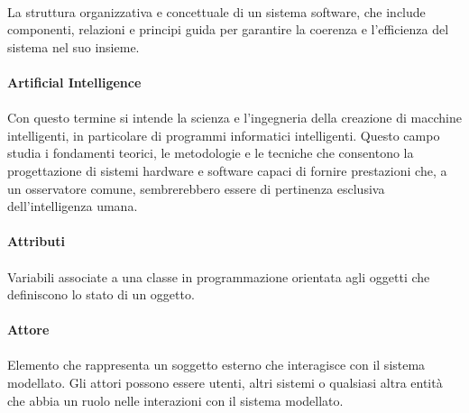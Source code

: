 \documentclass[10pt, a4paper]{article}
\begin{document}
\paragraph{}La struttura organizzativa e concettuale di un sistema software, che include componenti, relazioni e principi guida per garantire la coerenza e l'efficienza del sistema nel suo insieme.



\vspace{2em}
\paragraph{Artificial Intelligence}\noindent\hrulefill
\paragraph{}Con questo termine si intende la scienza e l’ingegneria della creazione di macchine intelligenti, in particolare di programmi informatici intelligenti. Questo campo studia i fondamenti teorici, le metodologie e le tecniche che consentono la progettazione di sistemi hardware e software capaci di fornire prestazioni che, a un osservatore comune, sembrerebbero essere di pertinenza esclusiva dell’intelligenza umana.

\vspace{2em}
\paragraph{Attributi}\noindent\hrulefill
\paragraph{}Variabili associate a una classe in programmazione orientata agli oggetti che definiscono lo stato di un oggetto.


\vspace{2em}
\paragraph{Attore}\noindent\hrulefill
\paragraph{}Elemento che rappresenta un soggetto esterno che interagisce con il sistema modellato. Gli attori possono essere utenti, altri sistemi o qualsiasi altra entità che abbia un ruolo nelle interazioni con il sistema modellato.
\end{document}

